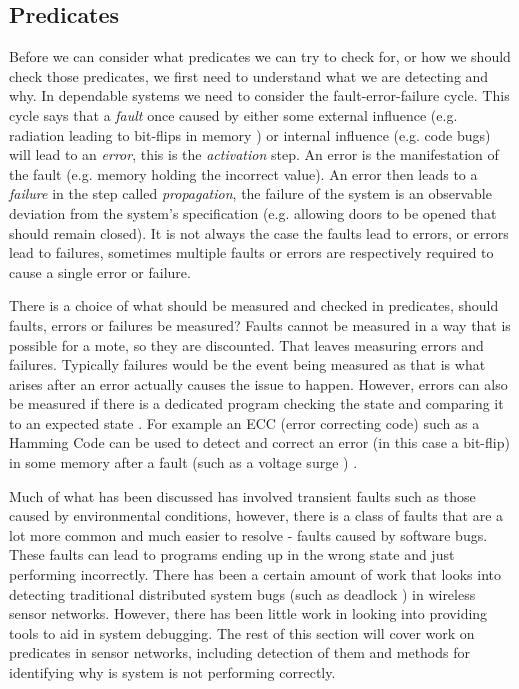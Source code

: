 \subsection{Predicates}

Before we can consider what predicates we can try to check for, or how we should check those predicates, we first need to understand what we are detecting and why. In dependable systems we need to consider the fault-error-failure cycle. This cycle says that a \emph{fault} once caused by either some external influence (e.g. radiation leading to bit-flips in memory \cite{?}) or internal influence (e.g. code bugs) will lead to an \emph{error}, this is the \emph{activation} step. An error is the manifestation of the fault (e.g. memory holding the incorrect value). An error then leads to a \emph{failure} in the step called \emph{propagation}, the failure of the system is an observable deviation from the system's specification (e.g. allowing doors to be opened that should remain closed). It is not always the case the faults lead to errors, or errors lead to failures, sometimes multiple faults or errors are respectively required to cause a single error or failure. \cite{1335465}

There is a choice of what should be measured and checked in predicates, should faults, errors or failures be measured? Faults cannot be measured \cite{?} in a way that is possible for a mote, so they are discounted. That leaves measuring errors and failures. Typically failures would be the event being measured \cite{?} as that is what arises after an error actually causes the issue to happen. However, errors can also be measured if there is a dedicated program checking the state and comparing it to an expected state \cite{?}. For example an ECC (error correcting code) such as a Hamming Code can be used to detect and correct an error (in this case a bit-flip) in some memory after a fault (such as a voltage surge ) \cite{hamming1950error}.

Much of what has been discussed has involved transient faults such as those caused by environmental conditions, however, there is a class of faults that are a lot more common and much easier to resolve - faults caused by software bugs. These faults can lead to programs ending up in the wrong state and just performing incorrectly. There has been a certain amount of work that looks into detecting traditional distributed system bugs (such as deadlock \cite{?}) in wireless sensor networks. However, there has been little work in looking into providing tools to aid in system debugging. The rest of this section will cover work on predicates in sensor networks, including detection of them and methods for identifying why is system is not performing correctly.


